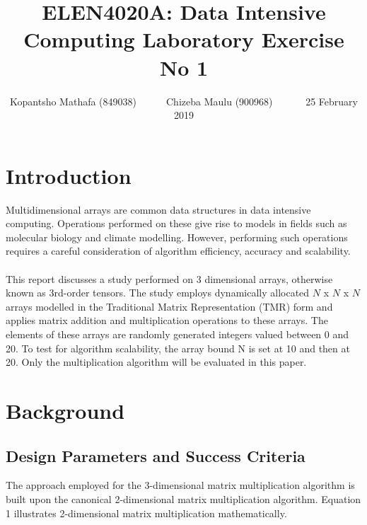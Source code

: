 \documentclass[a4paper, 11pt, onecolumn, conference]{IEEEtran}      %
\title{\LARGE \bf
ELEN4020A: Data Intensive Computing Laboratory Exercise No 1
}
\author{ Kopantsho Mathafa (849038)\ \ \ \ \ \ Chizeba Maulu (900968) \ \ \ \ \ \ 25 February 2019\\
}
\begin{document}
\maketitle

\section{Introduction}
Multidimensional arrays are common data structures in data intensive computing. Operations performed on these give rise to models in fields such as molecular biology and climate modelling. However, performing such operations requires a careful consideration of algorithm efficiency, accuracy and scalability. 
\\\\
This report discusses a study performed on 3 dimensional arrays, otherwise known as 3rd-order tensors. The study employs dynamically allocated $N$ x $N$ x $N$ arrays modelled in the Traditional Matrix Representation (TMR) form and applies matrix addition and multiplication operations to these arrays. The elements of these arrays are randomly generated integers valued between 0 and 20. To test for algorithm scalability, the array bound N is set at 10 and then at 20. Only the multiplication algorithm will be evaluated in this paper. 

\section{Background}
\subsection{Design Parameters and Success Criteria}

The approach employed for the 3-dimensional matrix multiplication algorithm is built upon the canonical 2-dimensional matrix multiplication algorithm. Equation 1 illustrates 2-dimensional matrix multiplication mathematically. 
\end{document}
